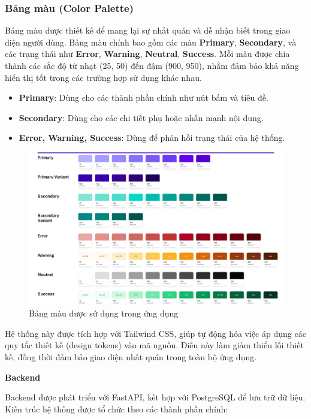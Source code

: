 \subsubsection*{Bảng màu (Color Palette)}
Bảng màu được thiết kế để mang lại sự nhất quán và dễ nhận biết trong giao diện người dùng. Bảng màu chính bao gồm các màu \textbf{Primary}, \textbf{Secondary}, và các trạng thái như \textbf{Error}, \textbf{Warning}, \textbf{Neutral}, \textbf{Success}. Mỗi màu được chia thành các sắc độ từ nhạt (25, 50) đến đậm (900, 950), nhằm đảm bảo khả năng hiển thị tốt trong các trường hợp sử dụng khác nhau.

\begin{itemize}
    \item \textbf{Primary}: Dùng cho các thành phần chính như nút bấm và tiêu đề.
    \item \textbf{Secondary}: Dùng cho các chi tiết phụ hoặc nhấn mạnh nội dung.
    \item \textbf{Error, Warning, Success}: Dùng để phản hồi trạng thái của hệ thống.
\end{itemize}

\begin{figure}[H]
    \centering
    \includegraphics[scale=0.15]{Images/Implement/Colors.jpg}
    \caption{Bảng màu được sử dụng trong ứng dụng}
\end{figure}

Hệ thống này được tích hợp với Tailwind CSS, giúp tự động hóa việc áp dụng các quy tắc thiết kế (design tokens) vào mã nguồn. Điều này làm giảm thiểu lỗi thiết kế, đồng thời đảm bảo giao diện nhất quán trong toàn bộ ứng dụng.


\textbf{Backend}

Backend được phát triển với FastAPI, kết hợp với PostgreSQL để lưu trữ dữ liệu. Kiến trúc hệ thống được tổ chức theo các thành phần chính:

